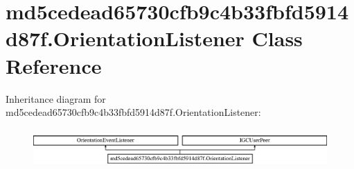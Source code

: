 \hypertarget{classmd5cedead65730cfb9c4b33fbfd5914d87f_1_1OrientationListener}{}\section{md5cedead65730cfb9c4b33fbfd5914d87f.\+Orientation\+Listener Class Reference}
\label{classmd5cedead65730cfb9c4b33fbfd5914d87f_1_1OrientationListener}
Inheritance diagram for md5cedead65730cfb9c4b33fbfd5914d87f.\+Orientation\+Listener\+:\begin{figure}[H]
\begin{center}
\leavevmode
\includegraphics[height=1.530055cm]{classmd5cedead65730cfb9c4b33fbfd5914d87f_1_1OrientationListener}
\end{center}
\end{figure}
